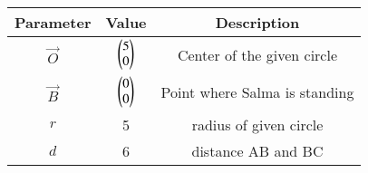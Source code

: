 
\begin{tabular}[]{|c|c|c|}
\hline
Parameter	& Value		& Description\\ \hline
$\vec{O}$	& $\begin{pmatrix}5\\0\end{pmatrix}$ &Center of the given circle \\ \hline
$\vec{B}$	& $\begin{pmatrix}0\\0\end{pmatrix}$ &Point where Salma is standing\\ \hline
$r$		& 5 & radius of given circle \\ \hline
$d$ 		& 6 & distance AB and BC\\ \hline
\end{tabular}